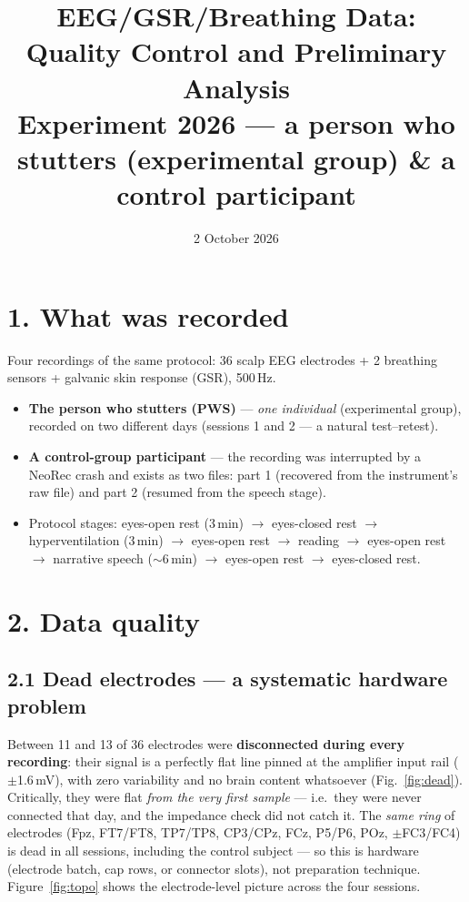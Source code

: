 \documentclass[11pt,a4paper]{article}
\title{\textbf{EEG/GSR/Breathing Data: Quality Control and Preliminary Analysis}\\[6pt]
\large Experiment 2026 --- a person who stutters (experimental group) \& a control participant}
\author{}
\date{2 October 2026}
\begin{document}
\maketitle
\vspace{-2.5cm}

\section*{1. What was recorded}
Four recordings of the same protocol: 36 scalp EEG electrodes + 2 breathing sensors + galvanic skin
response (GSR), 500\,Hz.
\begin{itemize}\setlength\itemsep{1pt}
\item \textbf{The person who stutters (PWS)} --- \emph{one individual}
      (experimental group), recorded on two different days (sessions 1 and 2 --- a natural test--retest).
\item \textbf{A control-group participant} --- the recording was interrupted by a
      NeoRec crash and exists as two files: part 1 (recovered from the instrument's raw file) and
      part 2 (resumed from the speech stage).
\item Protocol stages: eyes-open rest (3\,min) $\rightarrow$ eyes-closed rest $\rightarrow$
      hyperventilation (3\,min) $\rightarrow$ eyes-open rest $\rightarrow$ reading $\rightarrow$
      eyes-open rest $\rightarrow$ narrative speech ($\sim$6\,min) $\rightarrow$ eyes-open rest
      $\rightarrow$ eyes-closed rest.
\end{itemize}

\section*{2. Data quality}

\subsection*{2.1 Dead electrodes --- a systematic hardware problem}
Between 11 and 13 of 36 electrodes were \textbf{disconnected during every recording}: their signal is a
perfectly flat line pinned at the amplifier input rail ($\pm$1.6\,mV), with zero variability and no
brain content whatsoever (Fig.~\ref{fig:dead}). Critically, they were flat \emph{from the very first
sample} --- i.e.\ they were never connected that day, and the impedance check did not catch it.
The \emph{same ring} of electrodes (Fpz, FT7/FT8, TP7/TP8, CP3/CPz, FCz, P5/P6, POz, $\pm$FC3/FC4) is
dead in all sessions, including the control subject --- so this is hardware (electrode batch, cap rows,
or connector slots), not preparation technique. Figure~\ref{fig:topo} shows the electrode-level picture
across the four sessions.
\end{document}
